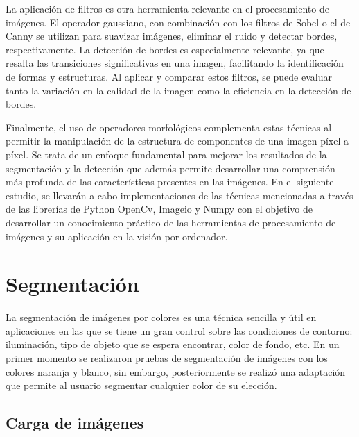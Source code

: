 \documentclass[a4paper,12pt]{article}
\begin{document}
{\vspace{0.5cm}

La aplicación de filtros es otra herramienta relevante en el procesamiento de imágenes. El operador gaussiano, con combinación con los filtros de
Sobel o el de Canny se utilizan para suavizar imágenes, eliminar el ruido y detectar bordes, respectivamente. La detección de bordes
es especialmente relevante, ya que resalta las transiciones significativas en una imagen, facilitando la identificación de 
 formas y estructuras. Al aplicar y comparar estos filtros, se puede evaluar tanto la variación en la calidad de la imagen como
la eficiencia en la detección de bordes.

\vspace{0.5cm}

Finalmente, el uso de operadores morfológicos complementa estas técnicas al permitir la manipulación de la estructura de componentes
de una imagen píxel a píxel. Se trata de un enfoque fundamental para mejorar los resultados de la segmentación y la 
detección que además permite desarrollar una comprensión más profunda de las características presentes en las imágenes. En el siguiente estudio, 
se llevarán a cabo implementaciones de las técnicas mencionadas a través de las librerías de Python OpenCv, Imageio y Numpy con el objetivo de
desarrollar un conocimiento práctico de las herramientas de procesamiento de imágenes y su aplicación en la visión por ordenador.

\newpage


\section{Segmentación}


\vspace{1cm}

La segmentación de imágenes por colores es una técnica sencilla y útil en aplicaciones en las que se tiene un gran control
sobre las condiciones de contorno: iluminación, tipo de objeto que se espera encontrar, color de fondo, etc.
En un primer momento se realizaron pruebas de segmentación de imágenes con los colores naranja y blanco, sin embargo, posteriormente
se realizó una adaptación que permite al usuario segmentar cualquier color de su elección.

\vspace{0.5cm}

\subsection{Carga de imágenes}

}
\end{document}
